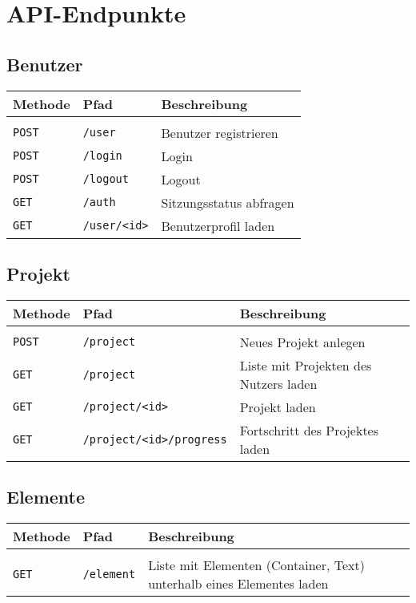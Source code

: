 \section{API-Endpunkte}\label{l:api-endpoints}

\subsection{Benutzer}

\begin{tabular}{@{}l l l}
\textbf{Methode} & \textbf{Pfad} & \textbf{Beschreibung}\\
\hline\\[-1.5ex]
\texttt{POST} & \texttt{/user} & Benutzer registrieren\\
\texttt{POST} & \texttt{/login} & Login\\
\texttt{POST} & \texttt{/logout} & Logout\\
\texttt{GET} & \texttt{/auth} & Sitzungsstatus abfragen\\
\texttt{GET} & \texttt{/user/<id>} & Benutzerprofil laden\\
\end{tabular}

\subsection{Projekt}

\begin{tabular}{@{}l l l}
\textbf{Methode} & \textbf{Pfad} & \textbf{Beschreibung}\\
\hline\\[-1.5ex]
\texttt{POST} & \texttt{/project} & Neues Projekt anlegen\\
\texttt{GET} & \texttt{/project} & Liste mit Projekten des Nutzers laden\\
\texttt{GET} & \texttt{/project/<id>} & Projekt laden\\
\texttt{GET} & \texttt{/project/<id>/progress} & Fortschritt des Projektes laden\\
\end{tabular}

\subsection{Elemente}

\begin{tabular}{@{}l l l}
\textbf{Methode} & \textbf{Pfad} & \textbf{Beschreibung}\\
\hline\\[-1.5ex]
\texttt{GET} & \texttt{/element} & Liste mit Elementen (Container, Text) unterhalb eines Elementes laden\\
\end{tabular}

